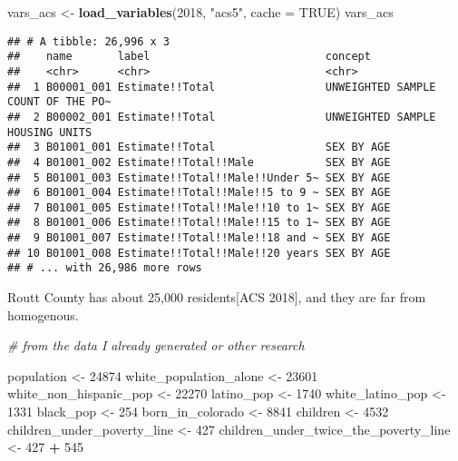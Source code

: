 \documentclass[]{article}
\newenvironment{Shaded}{\begin{snugshade}}{\end{snugshade}}
\newcommand{\CommentTok}[1]{\textcolor[rgb]{0.56,0.35,0.01}{\textit{#1}}}
\newcommand{\DataTypeTok}[1]{\textcolor[rgb]{0.13,0.29,0.53}{#1}}
\newcommand{\DecValTok}[1]{\textcolor[rgb]{0.00,0.00,0.81}{#1}}
\newcommand{\KeywordTok}[1]{\textcolor[rgb]{0.13,0.29,0.53}{\textbf{#1}}}
\newcommand{\NormalTok}[1]{#1}
\newcommand{\OperatorTok}[1]{\textcolor[rgb]{0.81,0.36,0.00}{\textbf{#1}}}
\newcommand{\OtherTok}[1]{\textcolor[rgb]{0.56,0.35,0.01}{#1}}
\newcommand{\StringTok}[1]{\textcolor[rgb]{0.31,0.60,0.02}{#1}}
\begin{document}
\begin{Shaded}
\begin{Highlighting}[]
\NormalTok{vars_acs <-}\StringTok{ }\KeywordTok{load_variables}\NormalTok{(}\DecValTok{2018}\NormalTok{, }\StringTok{"acs5"}\NormalTok{, }\DataTypeTok{cache =} \OtherTok{TRUE}\NormalTok{)}
\NormalTok{vars_acs}
\end{Highlighting}
\end{Shaded}

\begin{verbatim}
## # A tibble: 26,996 x 3
##    name       label                           concept                           
##    <chr>      <chr>                           <chr>                             
##  1 B00001_001 Estimate!!Total                 UNWEIGHTED SAMPLE COUNT OF THE PO~
##  2 B00002_001 Estimate!!Total                 UNWEIGHTED SAMPLE HOUSING UNITS   
##  3 B01001_001 Estimate!!Total                 SEX BY AGE                        
##  4 B01001_002 Estimate!!Total!!Male           SEX BY AGE                        
##  5 B01001_003 Estimate!!Total!!Male!!Under 5~ SEX BY AGE                        
##  6 B01001_004 Estimate!!Total!!Male!!5 to 9 ~ SEX BY AGE                        
##  7 B01001_005 Estimate!!Total!!Male!!10 to 1~ SEX BY AGE                        
##  8 B01001_006 Estimate!!Total!!Male!!15 to 1~ SEX BY AGE                        
##  9 B01001_007 Estimate!!Total!!Male!!18 and ~ SEX BY AGE                        
## 10 B01001_008 Estimate!!Total!!Male!!20 years SEX BY AGE                        
## # ... with 26,986 more rows
\end{verbatim}

Routt County has about 25,000 residents{[}ACS 2018{]}, and they are far
from homogenous.

\begin{Shaded}
\begin{Highlighting}[]
\CommentTok{# from the data I already generated or other research}

\NormalTok{population <-}\StringTok{ }\DecValTok{24874}
\NormalTok{white_population_alone <-}\StringTok{ }\DecValTok{23601}
\NormalTok{white_non_hispanic_pop <-}\StringTok{ }\DecValTok{22270}
\NormalTok{latino_pop <-}\StringTok{ }\DecValTok{1740}
\NormalTok{white_latino_pop <-}\StringTok{ }\DecValTok{1331}
\NormalTok{black_pop <-}\StringTok{ }\DecValTok{254}
\NormalTok{born_in_colorado <-}\StringTok{ }\DecValTok{8841}
\NormalTok{children <-}\StringTok{ }\DecValTok{4532}
\NormalTok{children_under_poverty_line <-}\StringTok{ }\DecValTok{427}
\NormalTok{children_under_twice_the_poverty_line <-}\StringTok{ }\DecValTok{427} \OperatorTok{+}\StringTok{ }\DecValTok{545}
\end{Highlighting}
\end{Shaded}
\end{document}
